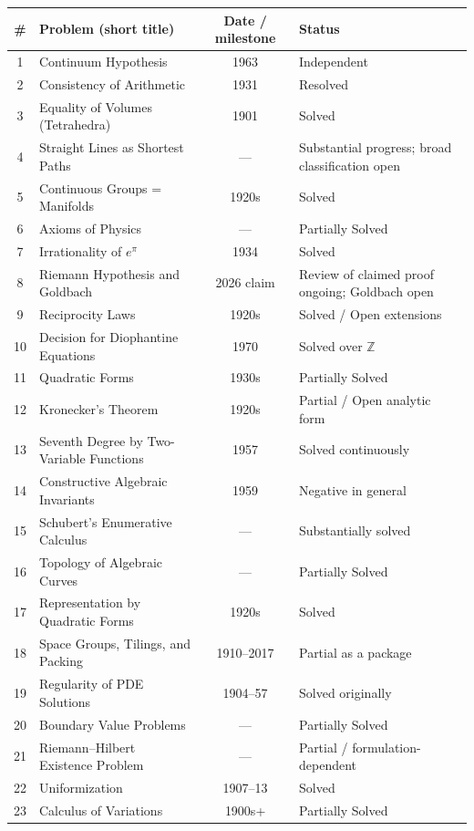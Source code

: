\begin{center}
\small
\renewcommand{\arraystretch}{1.2}
\begin{tabularx}{\textwidth}{c X c p{3.5cm}}
\toprule
\textbf{\#} & \textbf{Problem (short title)} & \textbf{Date / milestone} & \textbf{Status} \\
\midrule
1 & Continuum Hypothesis & 1963 & Independent \\
2 & Consistency of Arithmetic & 1931 & Resolved \\
3 & Equality of Volumes (Tetrahedra) & 1901 & Solved \\
4 & Straight Lines as Shortest Paths & --- & Substantial progress; broad classification open \\
5 & Continuous Groups = Manifolds & 1920s & Solved \\
6 & Axioms of Physics & --- & Partially Solved \\
7 & Irrationality of $e^\pi$ & 1934 & Solved \\
8 & Riemann Hypothesis and Goldbach & 2026 claim & Review of claimed proof ongoing; Goldbach open \\
9 & Reciprocity Laws & 1920s & Solved / Open extensions \\
10 & Decision for Diophantine Equations & 1970 & Solved over $\mathbb{Z}$ \\
11 & Quadratic Forms & 1930s & Partially Solved \\
12 & Kronecker's Theorem & 1920s & Partial / Open analytic form \\
13 & Seventh Degree by Two-Variable Functions & 1957 & Solved continuously \\
14 & Constructive Algebraic Invariants & 1959 & Negative in general \\
15 & Schubert's Enumerative Calculus & --- & Substantially solved \\
16 & Topology of Algebraic Curves & --- & Partially Solved \\
17 & Representation by Quadratic Forms & 1920s & Solved \\
18 & Space Groups, Tilings, and Packing & 1910--2017 & Partial as a package \\
19 & Regularity of PDE Solutions & 1904--57 & Solved originally \\
20 & Boundary Value Problems & --- & Partially Solved \\
21 & Riemann--Hilbert Existence Problem & --- & Partial / formulation-dependent \\
22 & Uniformization & 1907--13 & Solved \\
23 & Calculus of Variations & 1900s+ & Partially Solved \\
\bottomrule
\end{tabularx}
\end{center}

